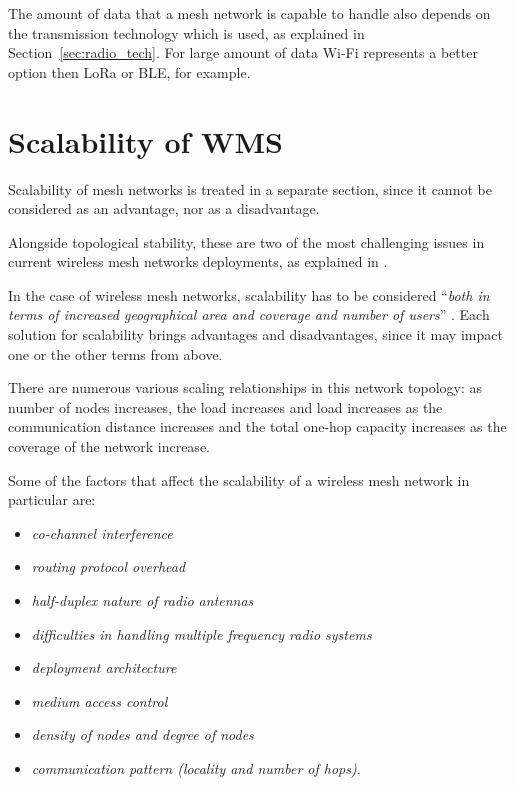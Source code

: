 			The amount of data that a mesh network is capable to handle also depends on the transmission technology which is used, as explained in Section~\ref{sec:radio_tech}.
			For large amount of data Wi-Fi represents a better option then LoRa or BLE, for example.
		
	\section{Scalability of WMS}\label{sec:scalability}
			
			Scalability of mesh networks is treated in a separate section, since it cannot be considered as an advantage, nor as a disadvantage.
			
			Alongside topological stability, these are two of the most challenging issues in current wireless mesh networks deployments, as explained in \cite{Sampaio-2015}.
			
			In the case of wireless mesh networks, scalability has to be considered ``\textit{both in terms of increased geographical area and coverage and number of users}'' \cite{92000412}.
			Each solution for scalability brings advantages and disadvantages, since it may impact one or the other terms from above.
			
			There are numerous various scaling relationships in this network topology: as number of nodes increases, the load increases and load increases as the communication distance increases and the total one-hop capacity increases as the coverage of the network increase.
			
			Some of the factors that affect the scalability of a wireless mesh network in particular are:
			\begin{itemize}
				\item \textit{co-channel interference}
				\item \textit{routing protocol overhead}
				\item \textit{half-duplex nature of radio antennas}
				\item \textit{difficulties in handling multiple frequency radio systems}
				\item \textit{deployment architecture}
				\item \textit{medium access control}
				\item \textit{density of nodes and  degree of nodes}
				\item \textit{communication pattern (locality and number of hops)}.
			\end{itemize}			
			
